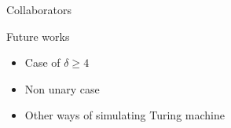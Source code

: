 \begin{frame}
\begin{center}
\begin{columns}[c]
\end{columns}
Collaborators
\end{center}

\begin{block}{Future works}
\begin{itemize}
\item Case of $\delta \geq 4$
\item Non unary case
\item Other ways of simulating Turing machine
\end{itemize}
\end{block}

\end{frame}









